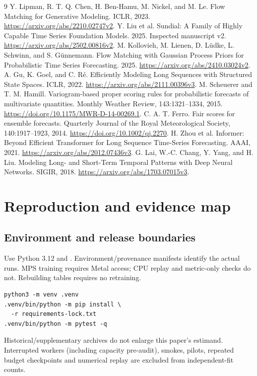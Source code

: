 \documentclass[10pt,twocolumn]{article}
\newcommand{\src}[1]{\texttt{\path{#1}}}
\begin{document}
\begin{thebibliography}{9}\small
{} Y. Lipman, R. T. Q. Chen, H. Ben-Hamu, M. Nickel, and M. Le. Flow Matching for Generative Modeling. ICLR, 2023. \url{https://arxiv.org/abs/2210.02747v2}.
 Y. Liu et al. Sundial: A Family of Highly Capable Time Series Foundation Models. 2025. Inspected manuscript v2. \url{https://arxiv.org/abs/2502.00816v2}.
 M. Kollovieh, M. Lienen, D. L\"udke, L. Schwinn, and S. G\"unnemann. Flow Matching with Gaussian Process Priors for Probabilistic Time Series Forecasting. 2025. \url{https://arxiv.org/abs/2410.03024v2}.
 A. Gu, K. Goel, and C. R\'e. Efficiently Modeling Long Sequences with Structured State Spaces. ICLR, 2022. \url{https://arxiv.org/abs/2111.00396v3}.
 M. Scheuerer and T. M. Hamill. Variogram-based proper scoring rules for probabilistic forecasts of multivariate quantities. Monthly Weather Review, 143:1321--1334, 2015. \url{https://doi.org/10.1175/MWR-D-14-00269.1}.
 C. A. T. Ferro. Fair scores for ensemble forecasts. Quarterly Journal of the Royal Meteorological Society, 140:1917--1923, 2014. \url{https://doi.org/10.1002/qj.2270}.
 H. Zhou et al. Informer: Beyond Efficient Transformer for Long Sequence Time-Series Forecasting. AAAI, 2021. \url{https://arxiv.org/abs/2012.07436v3}.
 G. Lai, W.-C. Chang, Y. Yang, and H. Liu. Modeling Long- and Short-Term Temporal Patterns with Deep Neural Networks. SIGIR, 2018. \url{https://arxiv.org/abs/1703.07015v3}.
\end{thebibliography}

\appendix
\setlength{\parskip}{0pt}
\section{Reproduction and evidence map}\label{app:reproduce}
\subsection{Environment and release boundaries}
Use Python 3.12 and \src{requirements-lock.txt}. Environment/provenance manifests identify the actual runs. MPS training requires Metal access; CPU replay and metric-only checks do not. Rebuilding tables requires no retraining.

\begin{verbatim}
python3 -m venv .venv
.venv/bin/python -m pip install \
  -r requirements-lock.txt
.venv/bin/python -m pytest -q
\end{verbatim}
Historical/supplementary archives do not enlarge this paper's estimand. Interrupted workers (including capacity pre-audit), smokes, pilots, repeated budget checkpoints and numerical replay are excluded from independent-fit counts.
\end{document}
